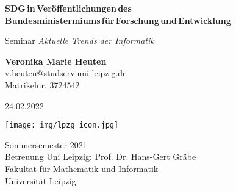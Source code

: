 \documentclass[letterpaper]{article}
\begin{document}
\begin{titlepage}
    \begin{center}
        \vspace*{2cm}
            
        \LARGE
        \textbf{SDG\,in\,Veröffentlichungen\,des\\
        Bundesministermiums\,für\,Forschung\,und\,Entwicklung\,}\\
            
        \vspace{0.5cm}
        \large
        Seminar \textit{Aktuelle Trends der Informatik}
            
        \vspace{3.0cm}
        
        \normalsize{\textbf{Veronika Marie Heuten}}\\
        \normalsize{v.heuten@studserv.uni-leipzig.de}\\
        \normalsize{Matrikelnr. 3724542}\\
            
           \vspace{3cm}


        24.02.2022
        
        \vspace{0.8cm}
            
        \texttt{[image: img/lpzg\_icon.jpg]}
          
        \vspace{0.8cm}
        
        \normalsize
        Sommersemester 2021\\
        \vspace{0.8cm}
        \small Betreuung Uni Leipzig: Prof. Dr. Hans-Gert Gräbe\\
        \small Fakultät für Mathematik und Informatik\\
        \small Universität Leipzig\\
            
    \end{center}
\end{titlepage}

\clearpage 
\tableofcontents
\clearpage
\end{document}
